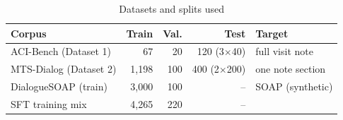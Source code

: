 \begin{table}[t]
\centering
\caption{Datasets and splits used}\label{tab:data}
\scriptsize
\setlength{\tabcolsep}{3pt}
\begin{tabular}{@{}lrrrl@{}}
\toprule
Corpus & Train & Val. & Test & Target\\
\midrule
ACI-Bench (Dataset 1) & 67 & 20 & 120 (3$\times$40) & full visit note\\
MTS-Dialog (Dataset 2) & 1,198 & 100 & 400 (2$\times$200) & one note section\\
DialogueSOAP (train) & 3,000 & 100 & -- & SOAP (synthetic)\\
\midrule
SFT training mix & 4,265 & 220 & -- & \\
\bottomrule
\end{tabular}
\end{table}

